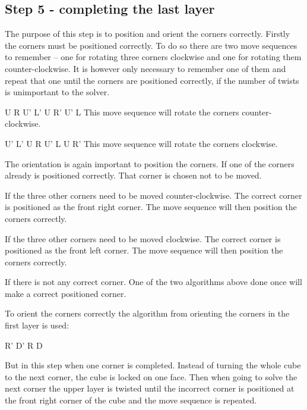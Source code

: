 \subsection{Step 5 - completing the last layer}
The purpose of this step is to position and orient the corners correctly. Firstly the corners must be positioned correctly. To do so there are two move sequences to remember -- one for rotating three corners clockwise and one for rotating them counter-clockwise. It is however only necessary to remember one of them and repeat that one until the corners are positioned correctly, if the number of twists is unimportant to the solver.

U R U' L' U R' U' L
This move sequence will rotate the corners counter-clockwise.

U' L' U R U' L U R'
This move sequence will rotate the corners clockwise.

The orientation is again important to position the corners. If one of the corners already is positioned correctly. That corner is chosen not to be moved. 

If the three other corners need to be moved counter-clockwise. The correct corner is positioned as the front right corner. The move sequence will then position the corners correctly.

If the three other corners need to be moved clockwise. The correct corner is positioned as the front left corner. The move sequence will then position the corners correctly.

If there is not any correct corner. One of the two algorithms above done once will make a correct positioned corner.

To orient the corners correctly the algorithm from orienting the corners in the first layer is used:

R' D' R D

But in this step when one corner is completed. Instead of turning the whole cube to the next corner, the cube is locked on one face. Then when going to solve the next corner the upper layer is twisted until the incorrect corner is positioned at the front right corner of the cube and the move sequence is repeated.